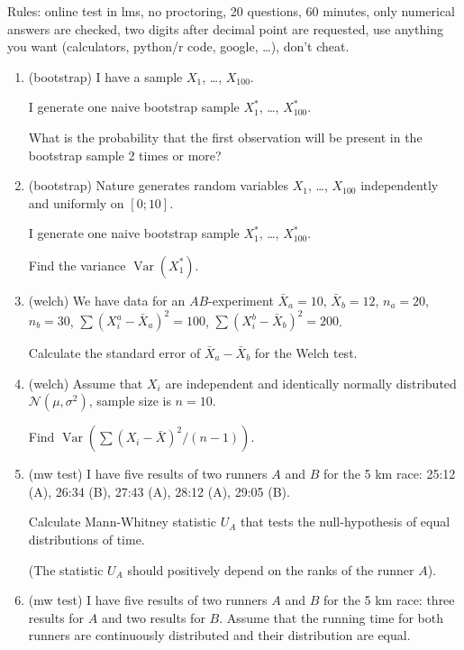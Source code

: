 \documentclass[12pt]{article}
\DeclareMathOperator{\Var}{Var}
\newcommand{\cN}{\mathcal{N}}
\begin{document}
Rules: online test in lms, no proctoring, 20 questions, 60 minutes, only numerical answers are checked, 
two digits after decimal point are requested, 
use anything you want (calculators, python/r code, google, \ldots), don't cheat. 


\begin{enumerate}
    \item (bootstrap) I have a sample $X_1$, \ldots, $X_{100}$.
    
    I generate one naive bootstrap sample $X^{*}_{1}$, \ldots, $X^{*}_{100}$. 

    What is the probability that the first observation will be present in the bootstrap sample 2 times or more?

    \item (bootstrap) Nature generates random variables $X_1$, \ldots, $X_{100}$ independently and uniformly on $[0;10]$.
    
    I generate one naive bootstrap sample $X_1^*$, \ldots, $X_{100}^*$. 

    Find the variance $\Var(X_1^*)$.
    \item (welch) We have data for an $AB$-experiment $\bar X_a = 10$, $\bar X_b = 12$, 
    $n_a = 20$, $n_b = 30$, $\sum (X_i^a - \bar X_a)^2 = 100$, $\sum (X_i^b - \bar X_b)^2 = 200$.

    Calculate the standard error of $\bar X_a - \bar X_b$ for the Welch test. 

    \item (welch) Assume that $X_i$ are independent and identically normally distributed $\cN(\mu, \sigma^2)$, 
    sample size is $n=10$. 
    
    Find $\Var(\sum (X_i - \bar X)^2 / (n - 1))$.
    
    \item (mw test) I have five results of two runners $A$ and $B$ for the 5 km race: 25:12 (A), 26:34 (B), 27:43 (A), 28:12 (A), 29:05 (B).
    
    Calculate Mann-Whitney statistic $U_A$ that tests the null-hypothesis of equal distributions of time. 
    
    (The statistic $U_A$ should positively depend on the ranks of the runner $A$). 
    \item (mw test) I have five results of two runners $A$ and $B$ for the 5 km race: three results for $A$ and two results for $B$.
    Assume that the running time for both runners are continuously distributed and their distribution are equal. 


\end{enumerate}
\end{document}

